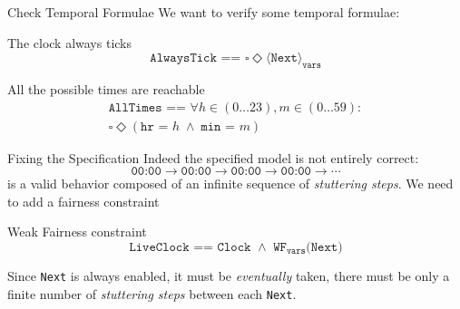 \begin{frame}{Check Temporal Formulae}
    We want to verify some temporal formulae:
    \pause
    \begin{block}{The clock always ticks}
        \[
            \texttt{AlwaysTick == } \square \Diamond \langle \texttt{Next} \rangle _{\texttt{vars}}
        \]
    \end{block}
    \pause
    \begin{block}{All the possible times are reachable}
        \begin{equation*}
            \begin{gathered}
                \texttt{AllTimes == } \forall h \in (0 \ldots 23), m \in (0 \ldots 59):\\
                \square \Diamond (\texttt{hr = } h\; \land\; \texttt{min = } m)
            \end{gathered}
        \end{equation*}
    \end{block}
    \demo
\end{frame}

\begin{frame}{Fixing the Specification}
    Indeed the specified model is not entirely correct:
    \[
        \texttt{00:00} \rightarrow \texttt{00:00} \rightarrow \texttt{00:00} \rightarrow \texttt{00:00} \rightarrow \cdots
    \]
    is a valid behavior composed of an infinite sequence of \emph{stuttering steps}.
    \pause
    We need to add a fairness constraint
    \begin{block}{Weak Fairness constraint}
        \[
            \texttt{LiveClock == Clock } \land \texttt{ WF}_{\texttt{vars}}\texttt{(Next)}
        \]

        Since \texttt{Next} is always enabled, it must be \emph{eventually} taken, there must be only a finite number of \emph{stuttering steps} between each \texttt{Next}.
    \end{block}
    \demo
\end{frame}
